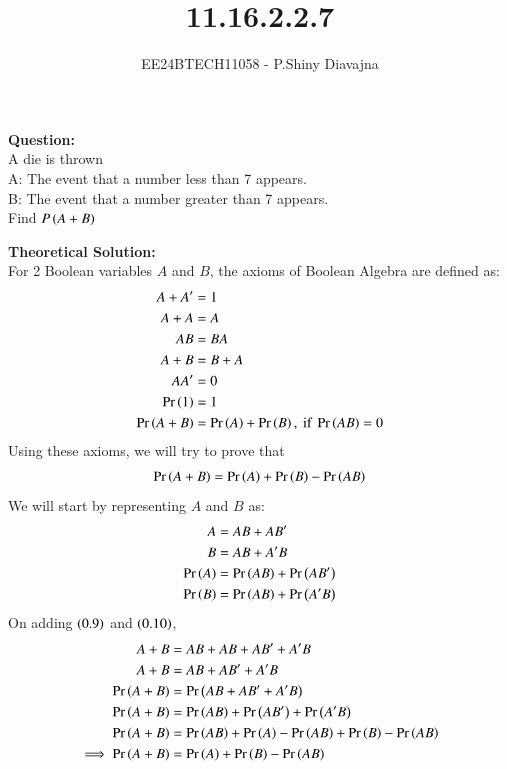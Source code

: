 \documentclass[journal]{IEEEtran}
\begin{document}

\vspace{3cm}

\title{11.16.2.2.7}
\author{EE24BTECH11058 - P.Shiny Diavajna}
{\let\newpage\relax\maketitle}

\renewcommand{\thefigure}{\theenumi}
\renewcommand{\thetable}{\theenumi}
\setlength{\intextsep}{10pt} %


\renewcommand{\thetable}{\theenumi}
\textbf{Question:}\\
A die is thrown\\
A: The event that a number less than 7 appears.\\
B: The event that a number greater than 7 appears.\\
Find $P\left(A+B\right)$


\textbf{Theoretical Solution:}\\
For 2 Boolean variables $A$ and $B$, the axioms of Boolean Algebra are defined as:
\begin{align}
	A + A^\prime &= 1\\
	A + A &= A\\
	AB &= BA\\
	A + B &= B + A\\
	AA^\prime &= 0\\
	\Pr\left(1\right) &= 1\\
	\Pr\left(A + B\right) &= \Pr\left(A\right) + \Pr\left(B\right), \text{ if } \Pr\left(AB\right) = 0
\end{align}
Using these axioms, we will try to prove that
\begin{align}
	\Pr\left(A + B\right) = \Pr\left(A\right) + \Pr\left(B\right) - \Pr\left(AB\right)
\end{align}
We will start by representing $A$ and $B$ as:
\begin{align}
	A &= AB + AB^\prime\\
	B &= AB + A^\prime B\\
	\Pr\left(A\right) &= \Pr\left(AB\right) + \Pr\left(AB^\prime\right)\\
	\Pr\left(B\right) &= \Pr\left(AB\right) + \Pr\left(A^\prime B\right)
\end{align}
On adding $\left(0.9\right)$ and $\left(0.10\right)$,
\begin{align}
	A + B &= AB + AB + AB^\prime + A^\prime B\\
	A + B &= AB + AB^\prime + A^\prime B\\
	\Pr\left(A + B\right) &= \Pr\left(AB + AB^\prime + A^\prime B\right)\\
	\Pr\left(A + B\right) &= \Pr\left(AB\right) + \Pr\left(AB^\prime\right) + \Pr\left(A^\prime B\right)\\
	\Pr\left(A + B\right) &= \Pr\left(AB\right) + \Pr\left(A\right) - \Pr\left(AB\right) + \Pr\left(B\right) - \Pr\left(AB\right)\\
	\implies \Pr\left(A + B\right) &= \Pr\left(A\right) + \Pr\left(B\right) - \Pr\left(AB\right)
\end{align}
\end{document}
